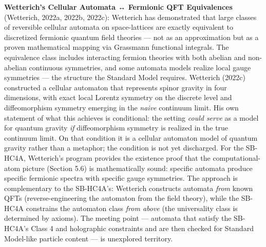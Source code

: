 \documentclass[
]{article}
\begin{document}
\textbf{Wetterich's Cellular Automata ↔ Fermionic QFT Equivalences}
(Wetterich, 2022a, 2022b, 2022c): Wetterich has demonstrated that large
classes of reversible cellular automata on space-lattices are exactly
equivalent to discretized fermionic quantum field theories --- not as an
approximation but as a proven mathematical mapping via Grassmann
functional integrals. The equivalence class includes interacting fermion
theories with both abelian and non-abelian continuous symmetries, and
some automata models realize local gauge symmetries --- the structure
the Standard Model requires. Wetterich (2022c) constructed a cellular
automaton that represents spinor gravity in four dimensions, with exact
local Lorentz symmetry on the discrete level and diffeomorphism symmetry
emerging in the \emph{naive} continuum limit. His own statement of what
this achieves is conditional: the setting \emph{could serve} as a model
for quantum gravity \emph{if} diffeomorphism symmetry is realized in the
true continuum limit. On that condition it is a cellular automaton model
of quantum gravity rather than a metaphor; the condition is not yet
discharged. For the SB-HC4A, Wetterich's program provides the existence
proof that the computational-atom picture (Section 5.6) is
mathematically sound: specific automata produce specific fermionic
spectra with specific gauge symmetries. The approach is complementary to
the SB-HC4A's: Wetterich constructs automata \emph{from} known QFTs
(reverse-engineering the automaton from the field theory), while the
SB-HC4A constrains the automaton class \emph{from above} (the
universality class is determined by axioms). The meeting point ---
automata that satisfy the SB-HC4A's Class 4 and holographic constraints
and are then checked for Standard Model-like particle content --- is
unexplored territory.
\end{document}
